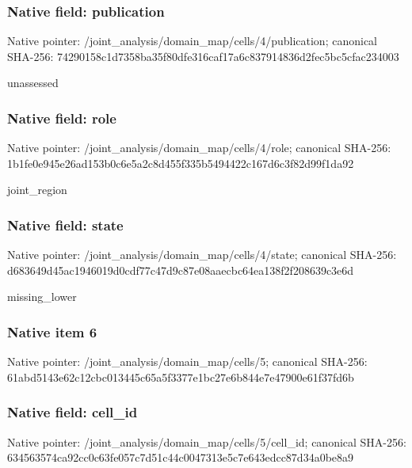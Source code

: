 \documentclass[10pt,a4paper]{article}
\begin{document}
\subsubsection{Native field: publication}
Native pointer: /joint\_\allowbreak{}analysis/domain\_\allowbreak{}map/cells/4/publication; canonical SHA-256: 74290158c1d7358ba35f80dfe316caf17a6c837914836d2fec5bc5cfac234003

\begingroup\raggedright\sloppy unassessed\par\endgroup

\subsubsection{Native field: role}
Native pointer: /joint\_\allowbreak{}analysis/domain\_\allowbreak{}map/cells/4/role; canonical SHA-256: 1b1fe0e945e26ad153b0c6e5a2c8d455f335b5494422c167d6c3f82d99f1da92

\begingroup\raggedright\sloppy joint\_\allowbreak{}region\par\endgroup

\subsubsection{Native field: state}
Native pointer: /joint\_\allowbreak{}analysis/domain\_\allowbreak{}map/cells/4/state; canonical SHA-256: d683649d45ac1946019d0cdf77c47d9c87e08aaecbc64ea138f2f208639c3e6d

\begingroup\raggedright\sloppy missing\_\allowbreak{}lower\par\endgroup

\subsubsection{Native item 6}
Native pointer: /joint\_\allowbreak{}analysis/domain\_\allowbreak{}map/cells/5; canonical SHA-256: 61abd5143e62c12cbc013445c65a5f3377e1bc27e6b844e7e47900e61f37fd6b

\subsubsection{Native field: cell\_\allowbreak{}id}
Native pointer: /joint\_\allowbreak{}analysis/domain\_\allowbreak{}map/cells/5/cell\_\allowbreak{}id; canonical SHA-256: 634563574ca92cc0c63fe057c7d51c44c0047313e5c7e643edcc87d34a0be8a9
\end{document}
